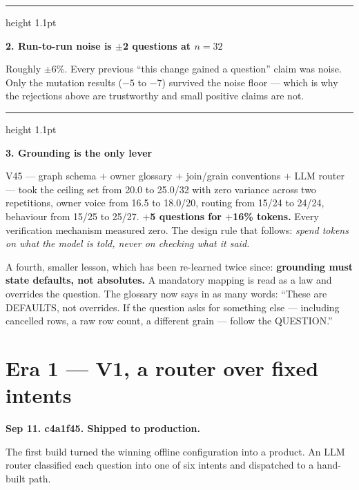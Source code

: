 \documentclass[11pt,a4paper]{report}
\newcommand{\sha}[1]{{\ttfamily\small\color{slate}#1}}
\newenvironment{keybox}[1]
 {\par\medskip\begin{center}\begin{minipage}{0.94\textwidth}%
  {\color{navy}\hrule height 1.1pt}\vspace{5pt}\par
  \textbf{\color{navy}#1}\par\vspace{3pt}\small}
 {\par\vspace{5pt}{\color{mist}\hrule height 0.8pt}\end{minipage}\end{center}\medskip}
\newenvironment{fitpic}
  {\par\medskip\begin{center}\begin{lrbox}{\fitbox}}
  {\end{lrbox}%
   \ifdim\wd\fitbox>\textwidth \resizebox{\textwidth}{!}{\usebox{\fitbox}}%
   \else \usebox{\fitbox}\fi
   \end{center}\medskip}
\begin{document}
\begin{keybox}{2. Run-to-run noise is $\pm$2 questions at $n=32$}
Roughly $\pm$6\%. Every previous ``this change gained a question'' claim was noise. Only the
mutation results ($-5$ to $-7$) survived the noise floor --- which is why the rejections above are
trustworthy and small positive claims are not.
\end{keybox}

\begin{keybox}{3. Grounding is the only lever}
V45 --- graph schema $+$ owner glossary $+$ join/grain conventions $+$ LLM router --- took the
ceiling set from 20.0 to 25.0/32 with zero variance across two repetitions, owner voice from 16.5
to 18.0/20, routing from 15/24 to 24/24, behaviour from 15/25 to 25/27. \textbf{$+$5 questions for
$+$16\% tokens.} Every verification mechanism measured zero. The design rule that follows:
\emph{spend tokens on what the model is told, never on checking what it said.}
\end{keybox}

\noindent A fourth, smaller lesson, which has been re-learned twice since: \textbf{grounding must
state defaults, not absolutes.} A mandatory mapping is read as a law and overrides the question.
The glossary now says in as many words: ``These are DEFAULTS, not overrides. If the question asks
for something else --- including cancelled rows, a raw row count, a different grain --- follow the
QUESTION.''

\section{Era 1 --- V1, a router over fixed intents}
\label{sec:era1}

\textbf{Sep 11. \sha{c4a1f45}. Shipped to production.}

The first build turned the winning offline configuration into a product. An LLM router classified
each question into one of six intents and dispatched to a hand-built path.

\begin{fitpic}
\end{fitpic}
\end{document}
